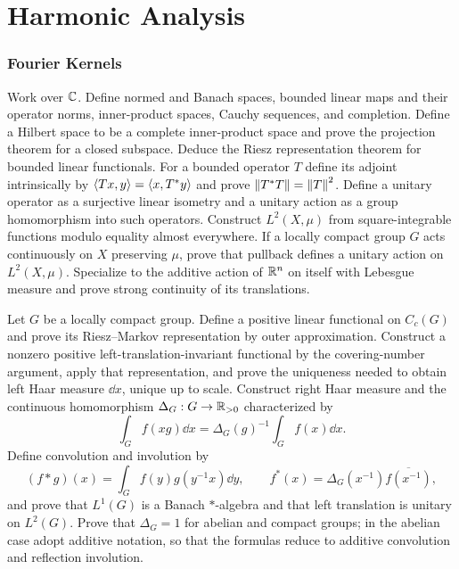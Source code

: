 \part{Harmonic Analysis}

\section{Fourier Kernels}

\begin{exercise}
Work over $\mathbb C$.  Define normed and Banach spaces, bounded linear maps and
their operator norms, inner-product spaces, Cauchy sequences, and completion.
Define a Hilbert space to be a complete inner-product space and prove the
projection theorem for a closed subspace.  Deduce the Riesz representation
theorem for bounded linear functionals.  For a bounded operator $T$ define
its adjoint intrinsically by
$\left\langle Tx,y\right\rangle=\left\langle x,T^*y\right\rangle$ and prove
$\left\lVert T^*T\right\rVert=\left\lVert T\right\rVert^2$.  Define a unitary operator as a surjective linear
isometry and a unitary action as a group homomorphism into such operators.
Construct $L^2(X,\mu)$ from square-integrable functions modulo equality
almost everywhere.  If a locally compact group $G$ acts continuously on $X$
preserving $\mu$, prove that pullback defines a unitary action on
$L^2(X,\mu)$.  Specialize to the additive action of $\mathbb R^n$ on itself with
Lebesgue measure and prove strong continuity of its translations.
\end{exercise}

\begin{exercise}
Let $G$ be a locally compact group.  Define a positive linear functional on
$C_c(G)$ and prove its Riesz--Markov representation by outer approximation.
Construct a
nonzero positive left-translation-invariant functional by the covering-number
argument, apply that representation, and prove the uniqueness needed to
obtain left Haar measure $\dd x$, unique up to scale.  Construct right Haar measure and
the continuous homomorphism $\Delta_G:G\to\mathbb R_{>0}$ characterized by
\[
 \int_G f(xg)\dd x=\Delta_G(g)^{-1}\int_Gf(x)\dd x.
\]
Define convolution and involution by
\[
 (f*g)(x)=\int_G f(y)g(y^{-1}x)\dd y,
 \qquad f^*(x)=\Delta_G(x^{-1})\overline{f(x^{-1})},
\]
and prove that $L^1(G)$ is a Banach $*$-algebra and that left translation is
unitary on $L^2(G)$.  Prove that $\Delta_G=1$ for abelian and compact groups;
in the abelian case adopt additive notation, so that the formulas reduce to
additive convolution and reflection involution.
\end{exercise}

